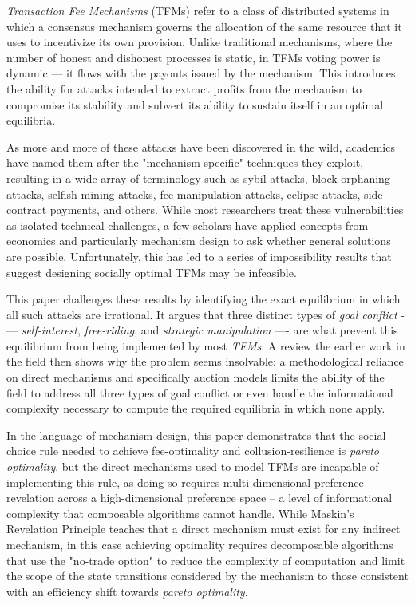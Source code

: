 
\emph{Transaction Fee Mechanisms} (TFMs) refer to a class of distributed systems in which a consensus mechanism governs the allocation of the same resource that it uses to incentivize its own provision. Unlike traditional mechanisms, where the number of honest and dishonest processes is static, in TFMs voting power is dynamic — it flows with the payouts issued by the mechanism. This introduces the ability for attacks intended to extract profits from the mechanism to compromise its stability and subvert its ability to sustain itself in an optimal equilibria.

As more and more of these attacks have been discovered in the wild, academics have named them after the "mechanism-specific" techniques they exploit, resulting in a wide array of terminology such as sybil attacks, block-orphaning attacks, selfish mining attacks, fee manipulation attacks, eclipse attacks, side-contract payments, and others. While most researchers treat these vulnerabilities as isolated technical challenges, a few scholars have applied concepts from economics and particularly mechanism design to ask whether general solutions are possible. Unfortunately, this has led to a series of impossibility results that suggest designing socially optimal TFMs may be infeasible.

This paper challenges these results by identifying the exact equilibrium in which all such attacks are irrational. It argues that three distinct types of \textit{goal conflict} -— \textit{self-interest}, \textit{free-riding}, and \textit{strategic manipulation} —- are what prevent this equilibrium from being implemented by most \textit{TFMs}. A review the earlier work in the field then shows why the problem seems insolvable: a methodological reliance on direct mechanisms and specifically auction models limits the ability of the field to address all three types of goal conflict or even handle the informational complexity necessary to compute the required equilibria in which none apply.

In the language of mechanism design, this paper demonstrates that the social choice rule needed to achieve fee-optimality and collusion-resilience is \textit{pareto optimality}, but the direct mechanisms used to model TFMs are incapable of implementing this rule, as doing so requires multi-dimensional preference revelation across a high-dimensional preference space -- a level of informational complexity that composable algorithms cannot handle. While Maskin's Revelation Principle teaches that a direct mechanism must exist for any indirect mechanism, in this case achieving optimality requires decomposable algorithms that use the "no-trade option" to reduce the complexity of computation and limit the scope of the state transitions considered by the mechanism to those consistent with an efficiency shift towards \textit{pareto optimality}.

